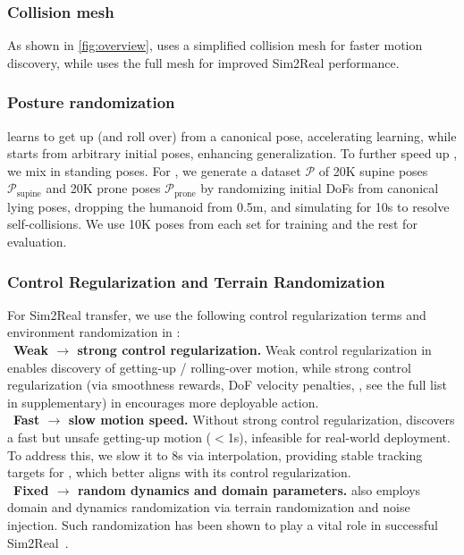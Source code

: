 \subsubsection{Collision mesh}
As shown in \cref{fig:overview}, \sone uses a simplified collision mesh for faster motion discovery, while \stwo uses the full mesh for improved Sim2Real performance. 

\subsubsection{Posture randomization}

\sone learns to get up (and roll over) from a canonical pose, accelerating learning, while \stwo starts from arbitrary initial poses, enhancing generalization. To further speed up \sone, we mix in standing poses.
For \stwo, we generate a dataset \(\mathcal{P}\) of 20K supine poses \(\mathcal{P}_{\text{supine}}\) and 20K prone poses \(\mathcal{P}_{\text{prone}}\) by randomizing initial DoFs from canonical lying poses, dropping the humanoid from 0.5m, and simulating for 10s to resolve self-collisions. We use 10K poses from each set for training and the rest for evaluation.

\subsubsection{Control Regularization and Terrain Randomization}
For Sim2Real transfer, we use the following control regularization terms and environment randomization in \stwo: \\
\textbullet~\textbf{Weak $\rightarrow$ strong control regularization.} Weak control regularization in \sone enables discovery of getting-up / rolling-over motion, while strong control regularization (via smoothness rewards, DoF velocity penalties, \etc, see the full list in supplementary) in \stwo encourages more deployable action.
\\
\textbullet~\textbf{Fast $\rightarrow$ slow motion speed. }
    Without strong control regularization, \sone discovers a fast but unsafe getting-up motion ($<$1s), infeasible for real-world deployment. 
    To address this, we slow it to 8s via interpolation, providing stable tracking targets for \stwo, which better aligns with its control regularization.
\\  
\textbullet~\textbf{Fixed $\rightarrow$ random dynamics and domain parameters.}
    \stwo also employs domain and dynamics randomization via terrain randomization and noise injection. Such randomization has been shown to play a vital role in successful Sim2Real~\cite{DomainRandomizationSim2Real17}.

